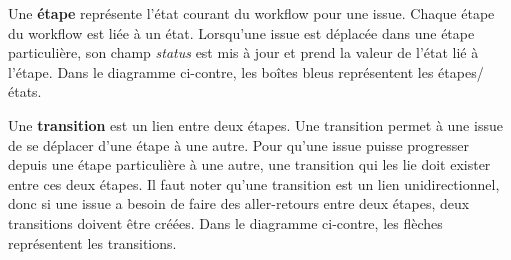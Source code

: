 Une \textbf{étape} représente l'état courant du workflow pour une issue.
Chaque étape du workflow est liée à un état. 
Lorsqu'une issue est déplacée dans une étape particulière, son champ
\textit{status} est mis à jour et prend la valeur de l'état lié à l'étape.
Dans le diagramme ci-contre, les boîtes bleus représentent les étapes/états.

Une \textbf{transition} est un lien entre deux étapes. Une transition permet
à une issue de se déplacer d'une étape à une autre. Pour qu'une issue puisse
progresser depuis une étape particulière à une autre, une transition qui les
lie doit exister entre ces deux étapes.
Il faut noter qu'une transition est un lien unidirectionnel, donc si une
issue a besoin de faire des aller-retours entre deux étapes, deux
transitions doivent être créées.
Dans le diagramme ci-contre, les flèches représentent les transitions.

